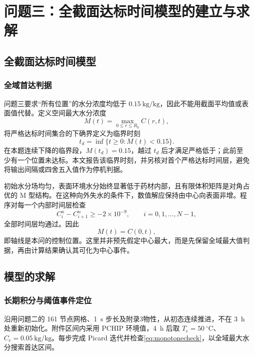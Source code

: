 \section{问题三：全截面达标时间模型的建立与求解}

\subsection{全截面达标时间模型}

\subsubsection{全域首达判据}

问题三要求“所有位置”的水分浓度均低于 $0.15~\mathrm{kg/kg}$，因此不能用截面平均值或表面值代替。定义空间最大水分浓度
\begin{equation}
M(t)=\max_{0\le r\le R_0}C(r,t),
\label{eq:maxmoisture}
\end{equation}
将严格达标时间集合的下确界定义为临界时刻
\begin{equation}
t_d=\inf\{t\ge0:M(t)<0.15\}.
\label{eq:firstpass}
\end{equation}
在本题连续下降的临界段，$M(t_d)=0.15$，越过 $t_d$ 后才满足严格低于；此前至少有一个位置未达标。本文报告该临界时刻，并另核对首个严格达标时间层，避免将输出间隔或四舍五入值作为停机判据。

初始水分场均匀，表面环境水分始终显著低于药材内部，且有限体积矩阵是对角占优的 M 型结构。在这种向外失水的条件下，数值解应保持由中心向表面非增。程序对每一个内部时间层检查
\begin{equation}
C_i^n-C_{i+1}^n\ge-2\times10^{-9},\qquad i=0,1,\ldots,N-1,
\label{eq:monotonecheck}
\end{equation}
全部时间层均通过。因此
\begin{equation}
M(t)=C(0,t),
\label{eq:centercontrol}
\end{equation}
即轴线是本问的控制位置。这里并非预先假定中心最大，而是先保留全域最大值判据，再由计算结果确认其可化为中心事件。

\subsection{模型的求解}

\subsubsection{长期积分与阈值事件定位}

沿用问题二的 161 节点网格、1~s 步长及附录3物性，从初态连续推进，不在 3~h 处重新初始化。附件区间内采用 PCHIP 环境值，4~h 后取 $T_e=50~{}^\circ\mathrm C$、$C_e=0.05~\mathrm{kg/kg}$。每步完成 Picard 迭代并检查\cref{eq:monotonecheck}，以全域最大水分搜索首达区间。

